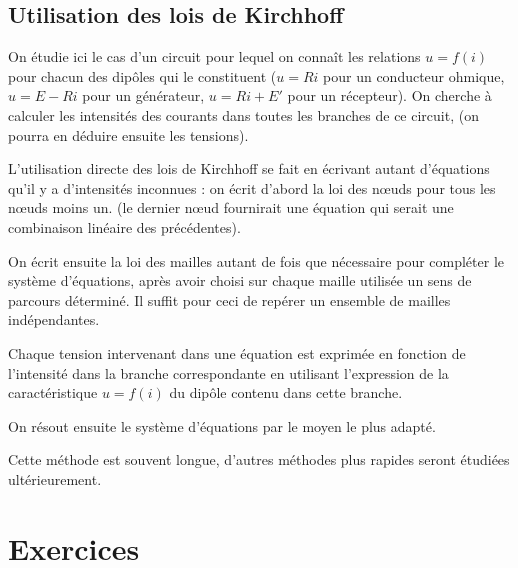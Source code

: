 \subsection{Utilisation des lois de Kirchhoff}%
\label{chap9-subsec:utilisationdeslois}%

On étudie ici le cas d'un circuit pour lequel on connaît les relations \(u = 
f(i)\) pour chacun des dipôles qui le constituent (\(u = R i\) pour un 
conducteur ohmique, \(u = E - R i\) pour un générateur, \(u = R i + E'\) pour 
un récepteur). On cherche à calculer les intensités des courants dans toutes 
les branches de ce circuit, (on pourra en déduire ensuite les tensions).

L'utilisation directe des lois de Kirchhoff se fait en écrivant autant 
d'équations qu'il y a d'intensités inconnues : on écrit d'abord la loi des 
nœuds pour tous les nœuds moins un. (le dernier nœud fournirait une équation 
qui serait une combinaison linéaire des précédentes).

On écrit ensuite la loi des mailles autant de fois que nécessaire pour 
compléter le système d'équations, après avoir choisi sur chaque maille utilisée 
un sens de parcours déterminé. Il suffit pour ceci de repérer un ensemble de 
mailles indépendantes.

Chaque tension intervenant dans une équation est exprimée en fonction de 
l'intensité dans la branche correspondante en utilisant l'expression de la 
caractéristique \(u = f(i)\) du dipôle contenu dans cette branche.

On résout ensuite le système d'équations par le moyen le plus adapté.

Cette méthode est souvent longue, d'autres méthodes plus rapides seront 
étudiées ultérieurement.

\clearpage
\section{Exercices}%
\label{chap9-sec:exercices}%

